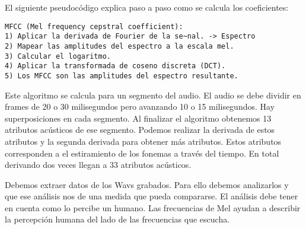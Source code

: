 El siguiente pseudocódigo explica paso a paso como se calcula los coeficientes:
\begin{lstlisting}
MFCC (Mel frequency cepstral coefficient):
1) Aplicar la derivada de Fourier de la se~nal. -> Espectro
2) Mapear las amplitudes del espectro a la escala mel.
3) Calcular el logaritmo.
4) Aplicar la transformada de coseno discreta (DCT).
5) Los MFCC son las amplitudes del espectro resultante.
\end{lstlisting}

Este algoritmo se calcula para un segmento del audio. El audio se debe dividir en frames de 20 o 30 milisegundos pero avanzando 10 o 15 milisegundos. Hay superposiciones en cada segmento. Al finalizar el algoritmo obtenemos 13 atributos acústicos de ese segmento. Podemos realizar la derivada de estos atributos y la segunda derivada para obtener más atributos. Estos atributos corresponden a el estiramiento de los fonemas a través del tiempo. En total derivando dos veces llegan a 33 atributos acústicos.

Debemos extraer datos de los Wavs grabados. Para ello debemos analizarlos y que ese análisis nos de una medida que pueda compararse. El análisis debe tener en cuenta como lo percibe un humano. Las frecuencias de Mel ayudan a describir la percepción humana del lado de las frecuencias que escucha. 


